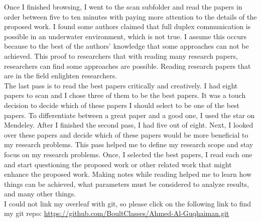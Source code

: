 \documentclass{article}
\begin{document}
Once I finished browsing, I went to the scan subfolder and read the papers in order between five to ten minutes with paying more attention to the details of the proposed work. I found some authors claimed that full duplex communication is possible in an underwater environment, which is not true. I assume this occurs because to the best of the authors' knowledge that some approaches can not be achieved. This proof to researchers that with reading many research papers, researchers can find some approaches are possible. Reading research papers that are in the field enlighten researchers.\\

The last pass is to read the best papers critically and creatively. I had eight papers to scan and I chose three of them to be the best papers. It was a touch decision to decide which of these papers I should select to be one of the best papers. To differentiate between a great paper and a good one, I used the star on Mendeley. After I finished the second pass, I had five out of eight. Next, I looked over these papers and decide which of these papers would be more beneficial to my research problems. This pass helped me to define my research scope and stay focus on my research problems. Once, I selected the best papers, I read each one and start questioning the proposed work or other related work that might enhance the proposed work. Making notes while reading helped me to learn how things can be achieved, what parameters must be considered to analyze results, and many other things. \\ 

I could not link my overleaf with git, so please click on the following link to find my git repo:
\url{https://github.com/BoultClasses/Ahmed-Al-Guqhaiman.git}
\end{document}
